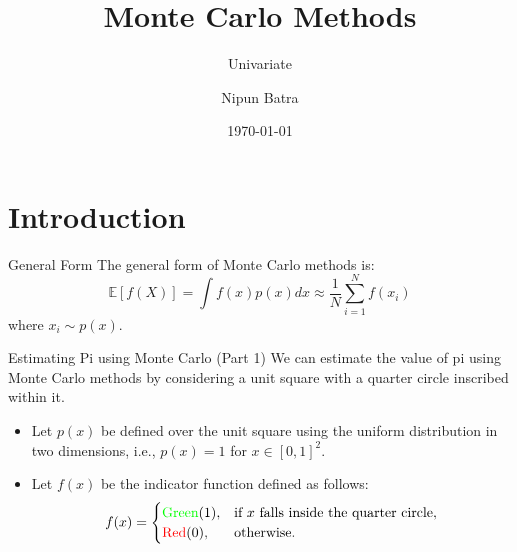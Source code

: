 \documentclass[handout]{beamer}
\begin{document}
\title{Monte Carlo Methods}
\subtitle{Univariate}
\author{Nipun Batra}
\date{\today}
\maketitle

\section{Introduction}

\begin{frame}{General Form}
The general form of Monte Carlo methods is:
\begin{equation}
    \mathbb{E}[f(X)] = \int f(x) p(x) dx \approx \frac{1}{N} \sum_{i=1}^N f(x_i)
\end{equation}
where $x_i \sim p(x)$.
\end{frame}
\begin{frame}[fragile]{Estimating Pi using Monte Carlo (Part 1)}
    We can estimate the value of pi using Monte Carlo methods by considering a unit square with a quarter circle inscribed within it.
    
    \begin{itemize}
        \item Let $p(x)$ be defined over the unit square using the uniform distribution in two dimensions, i.e., $p(x) = 1$ for $x \in [0, 1]^2$.
        \item Let $f(x)$ be the indicator function defined as follows:
            \[
            f(x) = \begin{cases}
                        \text{\textcolor{green}{Green}} (1), & \text{if } x \text{ falls inside the quarter circle}, \\
                        \text{\textcolor{red}{Red}} (0), & \text{otherwise}.
                   \end{cases}
            \]
    \end{itemize}
    
    \begin{center}
    \end{center}
    \end{frame}
    
\end{document}
